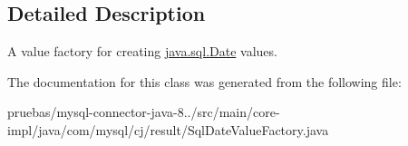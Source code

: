 \subsection{Detailed Description}
A value factory for creating \mbox{\hyperlink{}{java.\+sql.\+Date}} values. 

The documentation for this class was generated from the following file\+:\begin{DoxyCompactItemize}
\item 
pruebas/mysql-\/connector-\/java-\/8../src/main/core-\/impl/java/com/mysql/cj/result/Sql\+Date\+Value\+Factory.\+java\end{DoxyCompactItemize}
